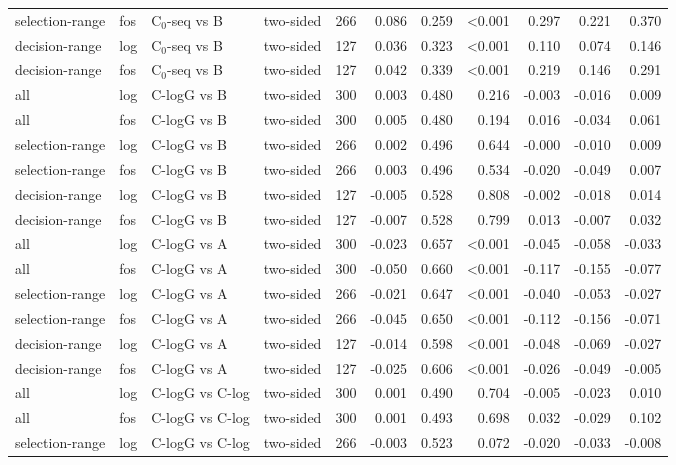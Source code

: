 \begin{longtable}{llllrrrrrrr}
selection-range & fos & C$_0$-seq vs B & two-sided & 266 & 0.086 & 0.259 & <0.001 & 0.297 & 0.221 & 0.370 \\
decision-range & log & C$_0$-seq vs B & two-sided & 127 & 0.036 & 0.323 & <0.001 & 0.110 & 0.074 & 0.146 \\
decision-range & fos & C$_0$-seq vs B & two-sided & 127 & 0.042 & 0.339 & <0.001 & 0.219 & 0.146 & 0.291 \\
all & log & C-logG vs B & two-sided & 300 & 0.003 & 0.480 & 0.216 & -0.003 & -0.016 & 0.009 \\
all & fos & C-logG vs B & two-sided & 300 & 0.005 & 0.480 & 0.194 & 0.016 & -0.034 & 0.061 \\
selection-range & log & C-logG vs B & two-sided & 266 & 0.002 & 0.496 & 0.644 & -0.000 & -0.010 & 0.009 \\
selection-range & fos & C-logG vs B & two-sided & 266 & 0.003 & 0.496 & 0.534 & -0.020 & -0.049 & 0.007 \\
decision-range & log & C-logG vs B & two-sided & 127 & -0.005 & 0.528 & 0.808 & -0.002 & -0.018 & 0.014 \\
decision-range & fos & C-logG vs B & two-sided & 127 & -0.007 & 0.528 & 0.799 & 0.013 & -0.007 & 0.032 \\
all & log & C-logG vs A & two-sided & 300 & -0.023 & 0.657 & <0.001 & -0.045 & -0.058 & -0.033 \\
all & fos & C-logG vs A & two-sided & 300 & -0.050 & 0.660 & <0.001 & -0.117 & -0.155 & -0.077 \\
selection-range & log & C-logG vs A & two-sided & 266 & -0.021 & 0.647 & <0.001 & -0.040 & -0.053 & -0.027 \\
selection-range & fos & C-logG vs A & two-sided & 266 & -0.045 & 0.650 & <0.001 & -0.112 & -0.156 & -0.071 \\
decision-range & log & C-logG vs A & two-sided & 127 & -0.014 & 0.598 & <0.001 & -0.048 & -0.069 & -0.027 \\
decision-range & fos & C-logG vs A & two-sided & 127 & -0.025 & 0.606 & <0.001 & -0.026 & -0.049 & -0.005 \\
all & log & C-logG vs C-log & two-sided & 300 & 0.001 & 0.490 & 0.704 & -0.005 & -0.023 & 0.010 \\
all & fos & C-logG vs C-log & two-sided & 300 & 0.001 & 0.493 & 0.698 & 0.032 & -0.029 & 0.102 \\
selection-range & log & C-logG vs C-log & two-sided & 266 & -0.003 & 0.523 & 0.072 & -0.020 & -0.033 & -0.008 \\

\end{longtable}
